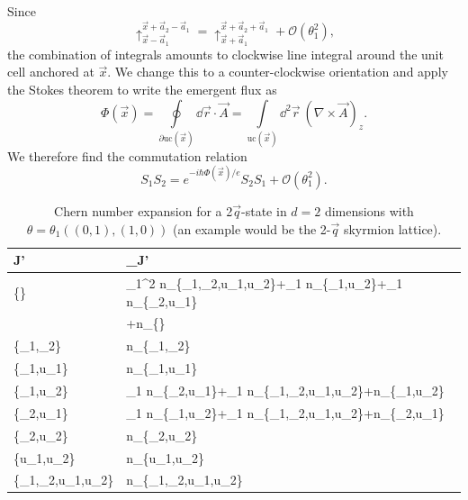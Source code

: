 \documentclass[
    10pt,
    aps,
    prb,
	longbibliography,
    twocolumn,
    floatfix,
    superscriptaddress,
]{revtex4-2}
\begin{document}
Since
\begin{equation}
	\uparrow_{\vec{x}-\vec{a}_1}^{\vec{x}+\vec{a}_2 -\vec{a}_1}
	=
	\uparrow_{\vec{x}+\vec{a}_1}^{\vec{x}+\vec{a}_2 +\vec{a}_1} + \mathcal{O}(\theta_1^2),
\end{equation}
the combination of integrals amounts to clockwise line integral around the unit cell  anchored at $\vec{x}$.
We change this to a counter-clockwise orientation and apply the Stokes theorem to write the emergent flux as
\begin{equation}
	\Phi(\vec{x}) = \oint\limits_{\partial \mathrm{uc}(\vec{x})} \dd\vec{r}\cdot \vec{A} = \int\limits_{\mathrm{uc}(\vec{x})} \dd^2\vec{r}~ (\nabla \times \vec{A})_z .
\end{equation}              
We therefore find the commutation relation
\begin{equation}
	S_1 S_2 = e^{-i\hbar \Phi(\vec{x})/ e} S_2 S_1 + \mathcal{O}(\theta_1^2).
\end{equation}    

\begin{table}[t]
	\begin{tabular}{L|L}
	J' & _{J'} \\ \toprule
	\{\} & \theta _1^2 n_{\left\{\tau _1,\tau _2,u_1,u_2\right\}}+\theta _1 n_{\left\{\tau _1,u_2\right\}}+\theta _1 n_{\left\{\tau _2,u_1\right\}} \\
	 & +n_{\{\}} \\
	\left\{\tau _1,\tau _2\right\} & n_{\left\{\tau _1,\tau _2\right\}} \\
	\left\{\tau _1,u_1\right\} & n_{\left\{\tau _1,u_1\right\}} \\
	\left\{\tau _1,u_2\right\} & \theta _1 n_{\left\{\tau _2,u_1\right\}}+\theta _1 n_{\left\{\tau _1,\tau _2,u_1,u_2\right\}}+n_{\left\{\tau _1,u_2\right\}} \\
	\left\{\tau _2,u_1\right\} & \theta _1 n_{\left\{\tau _1,u_2\right\}}+\theta _1 n_{\left\{\tau _1,\tau _2,u_1,u_2\right\}}+n_{\left\{\tau _2,u_1\right\}} \\
	\left\{\tau _2,u_2\right\} & n_{\left\{\tau _2,u_2\right\}} \\
	\left\{u_1,u_2\right\} & n_{\left\{u_1,u_2\right\}} \\
	\left\{\tau _1,\tau _2,u_1,u_2\right\} & n_{\left\{\tau _1,\tau _2,u_1,u_2\right\}}
	\end{tabular}
	\caption{Chern number expansion for a 2$\vec{q}$-state in $d=2$ dimensions with $\theta = \theta_1 ((0,1),(1,0))$ (an example would be the 2-$\vec{q}$ skyrmion lattice).
	}
	\label{tab:2q_2d}
\end{table}
		
\end{document}
